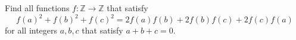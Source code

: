 \documentclass[11pt]{scrartcl}
\begin{document}
\begin{itemize}[label=,itemsep=0.4em,leftmargin=0em]
\begin{comment}
        Hence, the functions that satisfy are $\boxed{f(m) = -1, \forall m \in \mathbb{Z}}$, $\boxed{f(m) = m + 1, \forall m \in \mathbb{Z}}$.

    \end{comment}
    \begin{btvn}
        Find all functions $f: \mathbb{Z} \to \mathbb{Z}$ that satisfy
        \[
          f(a)^2 + f(b)^2 + f(c)^2 = 2f(a)f(b) + 2f(b)f(c) + 2f(c)f(a)
        \]
        for all integers $a,b,c$ that satisfy $a + b + c = 0$.
    \end{btvn}
    \begin{comment}
        Let \( c = - a - b \), we rewrite
        \[
            f(a)^2 + f(b)^2 + f(-a-b)^2 = 2f(a)f(b) +2f(-a-b)(f(a) + b(b)), \forall a,b \in \bb{Z} \tag{1}
        \]
        Let \( P(a,b) \) denote substitution into \( (1) \).

        \( P(0,0) \) yields \( 3f(0)^2 = 6f(0)^2 \ra f(0) = 0 \).

        \( P(a,0) \) gives \( f(a)^2 + f(-a)^2 = 2f(-a)f(a) \ra f(a) = f(-a), \forall a \in \bb{Z} \).

        Thus, \( f \) is an even function over \( \bb{Z} \).

        From \( (1) \), we rewrite
        \[
            f(a)^2 + f(b)^2 + f(a + b)^2 = 2f(a)f(b) + 2f(a + b)(f(a) + f(b)), \forall a,b \in \bb{Z} \tag{2}
        \]
        Substituting \( P(a,a) \) into \( (2) \), we get
        \[
            f(2a)^2 = 4f(2a)f(a) \ra (f(2a) - 4f(a))f(2a) = 0, \forall a \in \bb{Z}
        \]

        \vocab{Case 1:} \( f(2a) = 0, \forall a \in \bb{Z} \).

        Using \( (2) \) with \( P(2a,b) \), we obtain
        \[
            f(b)^2 + f(2a + b)^2 = f(2a + b)f(b) \ra f(b) = f(2a + b)
        \]
        Thus, for every odd \( b \), \( f(b) = c \) where \( c \in \bb{Z} \). Therefore, the function satisfying this is 
        \[
        \boxed{ f(a)=
        \left\{\begin{array}{rr}0,&a \text{ even }\\
            c,&a \text{ odd }
        \end{array}
        \right.
        }
        \]

        \vocab{Case 2:} \( f(2a) = 4f(a), \forall a \in \bb{Z} \).

        From \( (2) \) using \( P(2a,a) \), we obtain
        \[
            9f(a)^2 - 10f(a)f(3a) + f(3a)^2 = 0 \ra (f(3a) - f(a))(f(3a) - 9f(a)) = 0
        \]


\end{comment}
\end{itemize}
\end{document}
